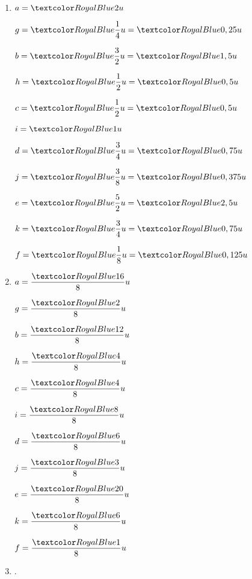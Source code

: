     \begin{enumerate}
        \item 
            \begin{multicols}{6}
                $a = \cor{2} u$ \par
                $g = \cor{\dfrac14}u =\cor{0,25}u$ \par 
                $b = \cor{\dfrac32}u =\cor{1,5}u$ \par
                $h = \cor{\dfrac12}u =\cor{0,5}u$\par
                $c = \cor{\dfrac12}u =\cor{0,5}u$ \par
                $i = \cor{1} u$ \par
                $d = \cor{\dfrac34}u =\cor{0,75}u$ \par
                $j = \cor{\dfrac38}u =\cor{0,375}u$ \par
                $e = \cor{\dfrac52}u =\cor{2,5}u$ \par
                $k = \cor{\dfrac34}u =\cor{0,75}u$ \par
                $f = \cor{\dfrac18}u =\cor{0,125}u$ \par
            \end{multicols} \medskip
        \item 
            \begin{multicols}{6}
                $a = \dfrac{\cor{16}}{8}u$ \par
                $g = \dfrac{\cor{2}}{8}u$ \par
                $b = \dfrac{\cor{12}}{8}u$ \par
                $h = \dfrac{\cor{4}}{8}u$ \par
                $c = \dfrac{\cor{4}}{8}u$ \par
                $i = \dfrac{\cor{8}}{8}u$ \par
                $d = \dfrac{\cor{6}}{8}u$ \par
                $j = \dfrac{\cor{3}}{8}u$ \par
                $e = \dfrac{\cor{20}}{8}u$ \par
                $k = \dfrac{\cor{6}}{8}u$ \par
                $f = \dfrac{\cor{1}}{8}u$ \par
            \end{multicols}
        \item {}.
    \end{enumerate}

